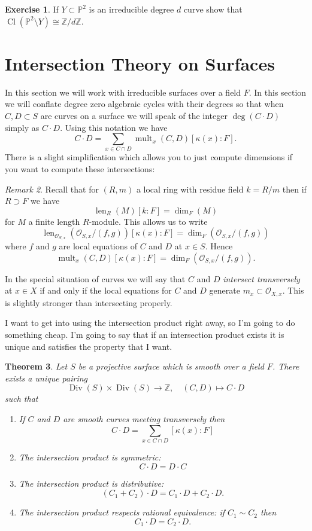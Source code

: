 \documentclass[12pt]{article}
\numberwithin{equation}{section}
\newtheorem{theorem}{Theorem}[subsection]
\theoremstyle{definition}
\newtheorem{exercise}[theorem]{Exercise}
\theoremstyle{remark}
\newtheorem{remark}[theorem]{Remark}
\newcommand{\ZZ}{\mathbb{Z}}
\newcommand{\Ocal}{\mathcal{O}}
\newcommand{\PP}{\mathbb{P}}
\newcommand{\Div}{\operatorname{Div}}
\newcommand{\Cl}{\operatorname{Cl}}
\newcommand{\mult}{\operatorname{mult}}
\newcommand{\len}{\operatorname{len}}
\begin{document}
\begin{exercise}
	If $Y \subset\PP^2$ is an irreducible degree $d$ curve show that $\Cl(\PP^2\setminus Y) \cong \ZZ/d\ZZ$. 
\end{exercise}

\section{Intersection Theory on Surfaces}
In this section we will work with irreducible surfaces over a field $F$. 
In this section we will conflate degree zero algebraic cycles with their degrees so that when $C,D \subset S$ are curves on a surface we will speak of the integer $\deg(C\cdot D)$ simply as $C\cdot D$.  
Using this notation we have 
 $$ C\cdot D = \sum_{x \in C\cap D} \mult_x(C,D)[\kappa(x):F].$$
There is a slight simplification which allows you to just compute dimensions if you want to compute these intersections:
\begin{remark}
Recall that for $(R,m)$ a local ring with residue field $k=R/m$ then if $R \supset F$ we have $$\len_R(M)[k:F] = \dim_F(M) $$ for $M$ a finite length $R$-module. 
This allows us to write 
 $$ \len_{\Ocal_{S,x}}(\Ocal_{S,x}/(f,g)) [\kappa(x):F] = \dim_F( \Ocal_{S,x}/(f,g))$$
where $f$ and $g$ are local equations of $C$ and $D$ at $x\in S$. Hence 
 $$ \mult_x(C,D)[\kappa(x):F] = \dim_F(\Ocal_{S,x}/(f,g)).$$
\end{remark}

In the special situation of curves we will say that $C$ and $D$ \emph{intersect transversely} at $x\in X$ if and only if the local equations for $C$ and $D$ generate $m_x \subset \Ocal_{X,x}$.
This is slightly stronger than intersecting properly. 

I want to get into using the intersection product right away, so I'm going to do something cheap. 
I'm going to say that if an intersection product exists it is unique and satisfies the property that I want. 
\begin{theorem}
	Let $S$ be a projective surface which is smooth over a field $F$.  
	There exists a unique pairing 
	$$\Div(S)\times\Div(S) \to \ZZ, \quad (C,D) \mapsto C\cdot D$$
	such that
	\begin{enumerate}
		\item If $C$ and $D$ are smooth curves meeting transversely then 
		$$C\cdot D = \sum_{x \in C\cap D} [\kappa(x):F]$$
		\item The intersection product is symmetric:
		$$C\cdot D = D\cdot C$$
		\item The intersection product is distributive: 
		$$(C_1+C_2)\cdot D = C_1 \cdot D + C_2\cdot D.$$
		\item The intersection product respects rational equivalence:
		if $C_1 \sim C_2$ then 
		$$C_1 \cdot D = C_2 \cdot D.$$ 
	\end{enumerate}
\end{theorem}
\end{document}
